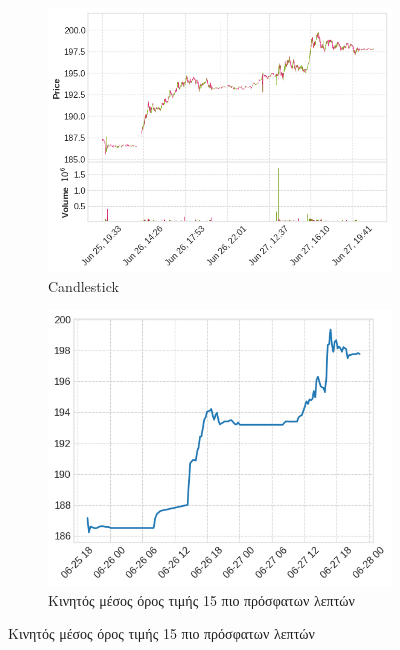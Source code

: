 \documentclass[12pt, a4paper]{article}
\begin{document}
\begin{figure}[h!]
  \centering
  \begin{subfigure}[b]{0.45\textwidth}
    \centering
    \includegraphics[width=\textwidth]{amzn_candlesticks.png}
    \caption{Candlestick}
    \label{fig:sub1}
  \end{subfigure}
  \hfill
  \begin{subfigure}[b]{0.45\textwidth}
    \centering
    \includegraphics[width=\textwidth]{amzn_ma.png}
    \caption{Κινητός μέσος όρος τιμής 15 πιο πρόσφατων λεπτών}
    \label{fig:sub2}
  \end{subfigure}


\end{figure}
\end{document}
